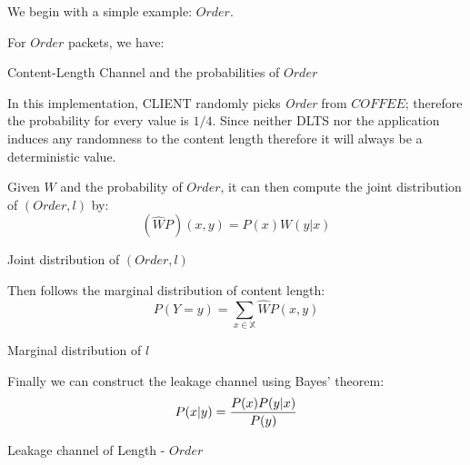 \begin{example} \label{Exmp: Single-Order}
We begin with a simple example: $Order$.

For $Order$ packets, we have:

\begin{table}[H]
\begin{center}
{}
\end{center}
\caption{Content-Length Channel and the probabilities of $Order$}
\label{Tbl: Order1}
\end{table}

In this implementation, CLIENT randomly picks \textit{Order} from $COFFEE$; therefore the probability for every value is $1/4$. Since neither DLTS nor the application induces any randomness to the content length therefore it will always be a deterministic value.

Given $W$ and the probability of $Order$, it can then compute the joint distribution of $(Order, l)$ by:
\begin{equation}
(\widehat{W}P)(x,y) = P(x)W(y|x)
\end{equation}

\begin{table}[H]
\begin{center}
{}
\end{center}
\caption{Joint distribution of $(Order, l)$}
\label{Tbl: Order2}
\end{table}

Then follows the marginal distribution of content length:
\begin{equation}
P(Y=y) = \sum\limits_{x \in \mathbb{X}}{\widehat{W}P(x,y)}
\end{equation}

\begin{table}[H]
\begin{center}
{}
\end{center}
\caption{Marginal distribution of $l$}
\label{Tbl: Order3}
\end{table}

Finally we can construct the leakage channel using Bayes’ theorem:
\begin{equation}
P(x|y) = {{P(x)P(y|x)} \over {P(y)}}
\end{equation}
\begin{table}[H]
\begin{center}
{}
\end{center}
\caption{Leakage channel of Length - $Order$}
\label{Tbl: Order4}
\end{table}

\end{example}


